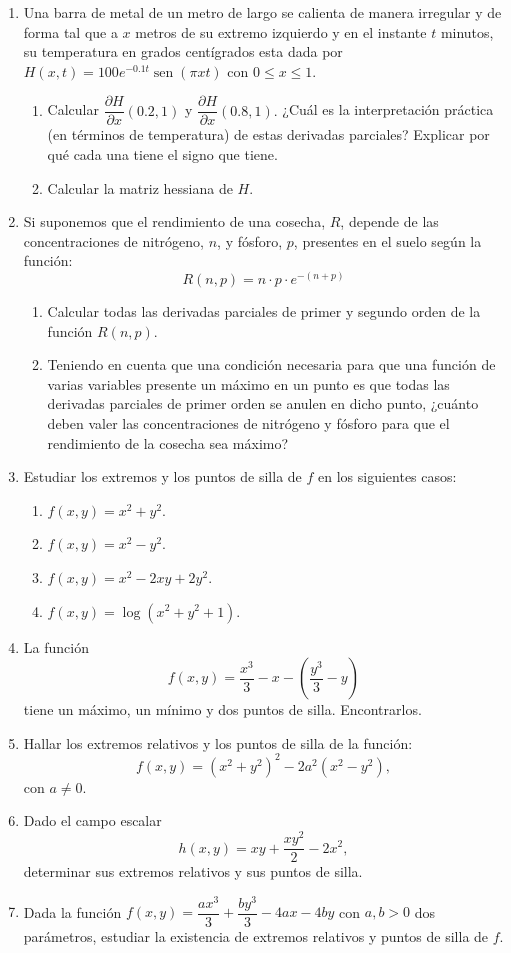 \documentclass[a4paper,titlepage]{article}
\DeclareMathOperator{\sen}{sen}
\theoremstyle{solution}
\begin{document}
\begin{enumerate}[resume, leftmargin=*]
\item Una barra de metal de un metro de largo se calienta de manera irregular y de forma tal que a $x$ metros de su extremo izquierdo y en el instante $t$ minutos, su temperatura en grados centígrados esta dada por $H(x,t) = 100e^{-0.1t}\sen(\pi xt)$ con $0\leq x \leq 1$. 
\begin{enumerate}
\item Calcular $\dfrac{\partial H}{\partial x}(0.2, 1)$ y $\dfrac{\partial H}{\partial x}(0.8, 1).$ ¿Cuál es la interpretación práctica (en términos de temperatura) de estas derivadas parciales? Explicar por qué cada una tiene el signo que tiene.  
\item Calcular la matriz hessiana de $H$. 
\end{enumerate}

\item Si suponemos que el rendimiento de una cosecha, $R$, depende de las concentraciones de nitrógeno, $n$, y fósforo, $p$, presentes en el suelo según la función:
\[
R(n,p)=n\cdot p\cdot e^{-(n+p)}
\]
\begin{enumerate}
\item Calcular todas las derivadas parciales de primer y segundo orden de la función $R(n,p)$.
\item Teniendo en cuenta que una condición necesaria para que una función de varias variables presente un máximo en un punto es que todas las derivadas parciales de primer orden se anulen en dicho punto, ¿cuánto deben valer las concentraciones de nitrógeno y fósforo para que el rendimiento de la cosecha sea máximo?
\end{enumerate}

\item Estudiar los extremos y los puntos de silla de $f$ en los siguientes casos:
\begin{enumerate}
\item $f(x,y) = x^2+y^2$.
\item $f(x,y) = x^2-y^2$.
\item $f(x,y) = x^2-2xy+2y^2$.
\item $f(x,y) = \log(x^2+y^2+1)$.
\end{enumerate}

\item La función 
\[
f(x,y) = \frac{x^3}{3}-x-\left(\frac{y^3}{3}-y\right)
\]
tiene un máximo, un mínimo y dos puntos de silla.
Encontrarlos.

\item Hallar los extremos relativos y los puntos de silla de la función:
\[
f(x,y) = (x^2+y^2)^2-2a^2(x^2-y^2),
\]
con $a\neq 0$.

\item Dado el campo escalar
\[
h(x,y) = xy+\frac{xy^2}{2}-2x^2,
\]
determinar sus extremos relativos y sus puntos de silla.

\item Dada la función $f(x, y) = \dfrac{ax^3}{3} + \dfrac{by^3}{3}-4ax-4by$ con $a,b>0$ dos parámetros, estudiar la existencia de extremos relativos y puntos de silla de $f$.

\end{enumerate}
\end{document}
